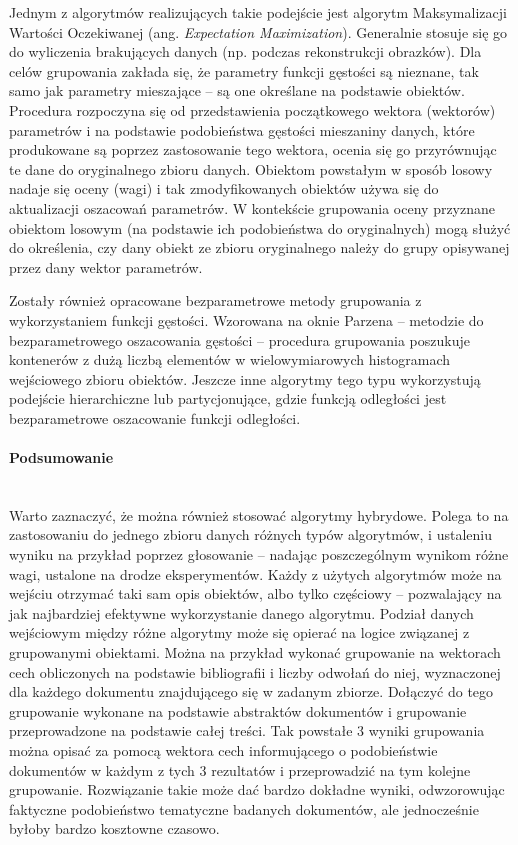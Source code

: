 \documentclass{article}
\newcommand{\myparagraph}[1]{\paragraph{#1}\mbox{}\\}
\begin{document}
Jednym z algorytmów realizujących takie podejście jest algorytm Maksymalizacji Wartości Oczekiwanej (ang. \textit{Expectation Maximization}). Generalnie stosuje się go do wyliczenia brakujących danych (np. podczas rekonstrukcji obrazków). Dla celów grupowania zakłada się, że parametry funkcji gęstości są nieznane, tak samo jak parametry mieszające – są one określane na podstawie obiektów. Procedura rozpoczyna się od przedstawienia początkowego wektora (wektorów) parametrów i na podstawie podobieństwa gęstości mieszaniny danych, które produkowane są poprzez zastosowanie tego wektora, ocenia się go przyrównując te dane do oryginalnego zbioru danych. Obiektom powstałym w sposób losowy nadaje się oceny (wagi) i tak zmodyfikowanych obiektów używa się do aktualizacji oszacowań parametrów. W kontekście grupowania oceny przyznane obiektom losowym (na podstawie ich podobieństwa do oryginalnych) mogą służyć do określenia, czy dany obiekt ze zbioru oryginalnego należy do grupy opisywanej przez dany wektor parametrów.

Zostały również opracowane bezparametrowe metody grupowania z wykorzystaniem funkcji gęstości. Wzorowana na oknie Parzena – metodzie do bezparametrowego oszacowania gęstości – procedura grupowania poszukuje kontenerów z dużą liczbą elementów w wielowymiarowych histogramach wejściowego zbioru obiektów. Jeszcze inne algorytmy tego typu wykorzystują podejście hierarchiczne lub partycjonujące, gdzie funkcją odległości jest bezparametrowe oszacowanie funkcji odległości. 

\myparagraph{Podsumowanie}

Warto zaznaczyć, że można również stosować algorytmy hybrydowe. Polega to na zastosowaniu do jednego zbioru danych różnych typów algorytmów, i ustaleniu wyniku na przykład poprzez głosowanie – nadając poszczególnym wynikom różne wagi, ustalone na drodze eksperymentów. Każdy z użytych algorytmów może na wejściu otrzymać taki sam opis obiektów, albo tylko częściowy – pozwalający na jak najbardziej efektywne wykorzystanie danego algorytmu. Podział danych wejściowym między różne algorytmy może się opierać na logice związanej z grupowanymi obiektami. Można na przykład wykonać grupowanie na wektorach cech obliczonych na podstawie bibliografii i liczby odwołań do niej, wyznaczonej dla każdego dokumentu znajdującego się w zadanym zbiorze. Dołączyć do tego grupowanie wykonane na podstawie abstraktów dokumentów i grupowanie przeprowadzone na podstawie całej treści. Tak powstałe 3 wyniki grupowania można opisać za pomocą wektora cech informującego o podobieństwie dokumentów w każdym z tych 3 rezultatów i przeprowadzić na tym kolejne grupowanie.
Rozwiązanie takie może dać bardzo dokładne wyniki, odwzorowując faktyczne podobieństwo tematyczne badanych dokumentów, ale jednocześnie byłoby bardzo kosztowne czasowo. 
\end{document}
